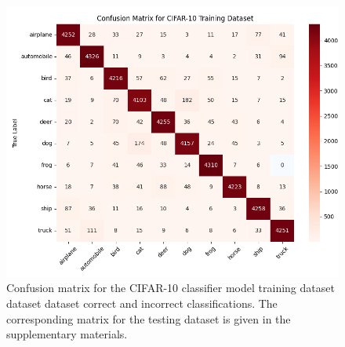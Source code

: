 \begin{figure}[ht]
    \centering   
    \includegraphics[width=0.99\columnwidth]{Figures/cifar10_training_confusion_matrix.png}
    \caption{Confusion matrix for the CIFAR-10 classifier model training dataset dataset dataset correct and incorrect classifications. The corresponding matrix for the testing dataset is given in the supplementary materials.}
    \label{fig:cifar10_training_confusion_matrix}
\end{figure}







